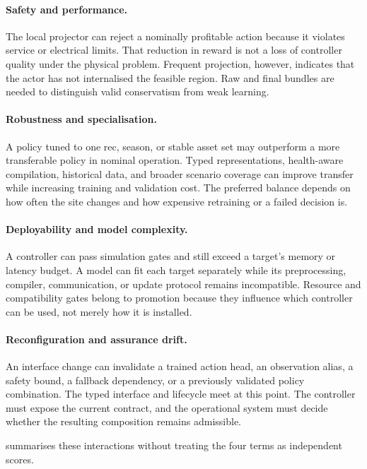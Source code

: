 \paragraph{Safety and performance.}
The local projector can reject a nominally profitable action because it violates service or electrical limits. That reduction in reward is not a loss of controller quality under the physical problem. Frequent projection, however, indicates that the actor has not internalised the feasible region. Raw and final bundles are needed to distinguish valid conservatism from weak learning.

\paragraph{Robustness and specialisation.}
A policy tuned to one \gls{rec}, season, or stable asset set may outperform a more transferable policy in nominal operation. Typed representations, health-aware compilation, historical data, and broader scenario coverage can improve transfer while increasing training and validation cost. The preferred balance depends on how often the site changes and how expensive retraining or a failed decision is.

\paragraph{Deployability and model complexity.}
A controller can pass simulation gates and still exceed a target's memory or latency budget. A model can fit each target separately while its preprocessing, compiler, communication, or update protocol remains incompatible. Resource and compatibility gates belong to promotion because they influence which controller can be used, not merely how it is installed.

\paragraph{Reconfiguration and assurance drift.}
An interface change can invalidate a trained action head, an observation alias, a safety bound, a fallback dependency, or a previously validated policy combination. The typed interface and lifecycle meet at this point. The controller must expose the current contract, and the operational system must decide whether the resulting composition remains admissible.

 summarises these interactions without treating the four terms as independent scores.


